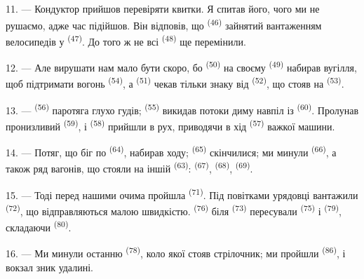 11. --- Кондуктор прийшов перевіряти квитки. Я спитав його, чого ми не рушаємо,
адже час підійшов. Він відповів, що 
\textsuperscript{(46)} зайнятий вантаженням велосипедів у  \textsuperscript{(47)}. До того ж не всі 
\textsuperscript{(48)} ще перемінили.

12. --- Але вирушати нам мало бути скоро, бо 
\textsuperscript{(50)} на своєму  \textsuperscript{(49)} набирав
вугілля, щоб підтримати вогонь  \textsuperscript{(54)}, а
 \textsuperscript{(51)} чекав тільки знаку від
 \textsuperscript{(52)}, що стояв на
 \textsuperscript{(53)}.

13. ---  \textsuperscript{(56)} паротяга глухо гудів;
 \textsuperscript{(55)} викидав потоки диму навпіл із
 \textsuperscript{(60)}. Пролунав пронизливий 
\textsuperscript{(59)}, і  \textsuperscript{(58)} прийшли в рух,
приводячи в хід  \textsuperscript{(57)} важкої машини.

\VUsaut{3.0mm}
\VUsaut{3.0mm}

14. --- Потяг, що біг по  \textsuperscript{(64)}, набирав ходу;
 \textsuperscript{(65)} скінчилися; ми минули 
\textsuperscript{(66)}, а також ряд вагонів, що стояли на іншій 
\textsuperscript{(63)}:  \textsuperscript{(67)},
 \textsuperscript{(68)}, 
\textsuperscript{(69)}.


15. --- Тоді перед нашими очима пройшла 
\textsuperscript{(71)}. Під повітками урядовці вантажили 
\textsuperscript{(72)}, що відправляються малою швидкістю. 
\textsuperscript{(76)} біля  \textsuperscript{(73)}
пересували  \textsuperscript{(75)} і
 \textsuperscript{(79)}, складаючи 
\textsuperscript{(80)}.

16. --- Ми минули останню  \textsuperscript{(78)}, коло якої
стояв стрілочник; ми пройшли  \textsuperscript{(86)}, і вокзал
зник удалині.

